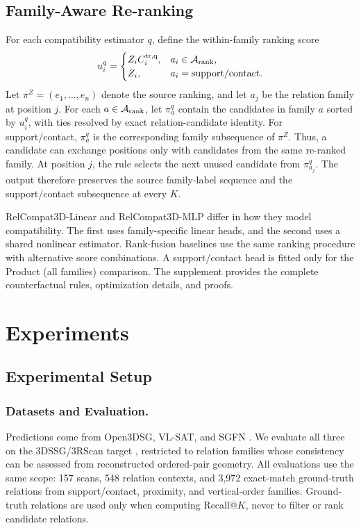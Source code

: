 \subsection{Family-Aware Re-ranking}
For each compatibility estimator $q$, define the within-family ranking score
\begin{equation}
u_i^q=\begin{cases}
Z_iC_i^{\rm tr,q}, & a_i\in\mathcal A_{\rm rank},\\
Z_i, & a_i=\mathrm{support/contact}.
\end{cases}
\end{equation}
Let $\pi^Z=(e_1,\ldots,e_n)$ denote the source ranking, and let $a_j$ be the relation family at position $j$. For each $a\in\mathcal A_{\rm rank}$, let $\pi_a^q$ contain the candidates in family $a$ sorted by $u_i^q$, with ties
resolved by exact relation-candidate identity. For support/contact, $\pi_a^q$ is the corresponding family subsequence of $\pi^Z$. Thus, a candidate can exchange positions only with candidates from the same re-ranked family. At position $j$, the rule selects the next unused candidate from $\pi_{a_j}^q$. The output therefore preserves the source family-label sequence and the support/contact subsequence at every $K$.

RelCompat3D-Linear and RelCompat3D-MLP differ in how they model compatibility. The first uses family-specific linear heads, and the second uses a shared nonlinear estimator. Rank-fusion baselines use the same ranking procedure with alternative score combinations. A support/contact head is fitted only for the Product (all families) comparison.
The supplement provides the complete counterfactual rules, optimization details, and proofs.

\section{Experiments}
\subsection{Experimental Setup}
\subsubsection{Datasets and Evaluation.}
Predictions come from Open3DSG, VL-SAT, and SGFN \cite{wang2023vl,koch2024open3dsg,wu2021scenegraphfusion}. We evaluate all three on the 3DSSG/3RScan target \cite{wald2019rio,wald2020learning}, restricted to relation families whose consistency can be assessed from reconstructed ordered-pair geometry. All evaluations use the same scope: 157 scans, 548 relation contexts, and 3,972 exact-match ground-truth relations from support/contact, proximity, and vertical-order families. Ground-truth relations are used only when computing Recall@$K$, never to filter or rank candidate relations. 

